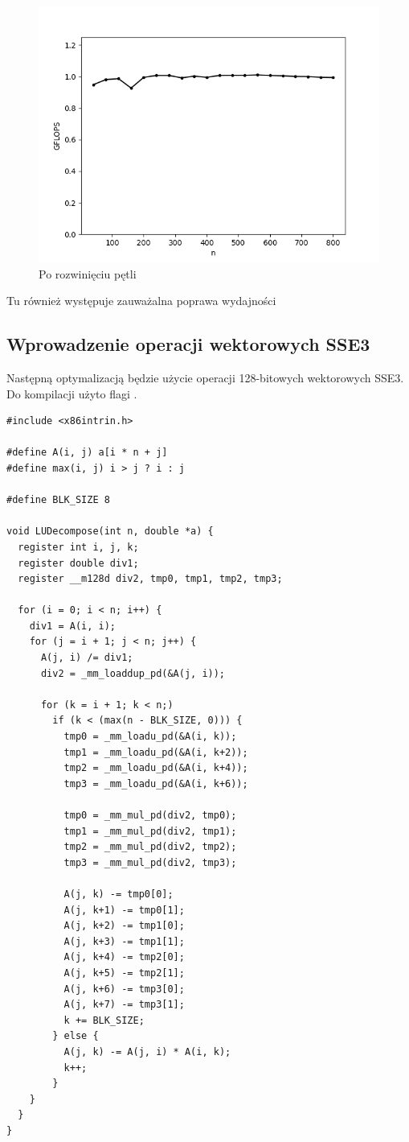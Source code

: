 \documentclass{article}
\begin{document}
\begin{figure}[H]
    \centering
    \includegraphics[width=1.0\textwidth]{figures/fig2.png}
    \caption{Po rozwinięciu pętli}
\end{figure}

Tu również występuje zauważalna poprawa wydajności

\subsection{Wprowadzenie operacji wektorowych SSE3}

Następną optymalizacją będzie użycie operacji 128-bitowych wektorowych SSE3.
Do kompilacji użyto flagi .

\begin{verbatim}
#include <x86intrin.h>

#define A(i, j) a[i * n + j]
#define max(i, j) i > j ? i : j

#define BLK_SIZE 8

void LUDecompose(int n, double *a) {
  register int i, j, k; 
  register double div1;
  register __m128d div2, tmp0, tmp1, tmp2, tmp3;

  for (i = 0; i < n; i++) {
    div1 = A(i, i);
    for (j = i + 1; j < n; j++) {
      A(j, i) /= div1;
      div2 = _mm_loaddup_pd(&A(j, i));

      for (k = i + 1; k < n;)
        if (k < (max(n - BLK_SIZE, 0))) {
          tmp0 = _mm_loadu_pd(&A(i, k));
          tmp1 = _mm_loadu_pd(&A(i, k+2));
          tmp2 = _mm_loadu_pd(&A(i, k+4));
          tmp3 = _mm_loadu_pd(&A(i, k+6));

          tmp0 = _mm_mul_pd(div2, tmp0);
          tmp1 = _mm_mul_pd(div2, tmp1);
          tmp2 = _mm_mul_pd(div2, tmp2);
          tmp3 = _mm_mul_pd(div2, tmp3);

          A(j, k) -= tmp0[0];
          A(j, k+1) -= tmp0[1];
          A(j, k+2) -= tmp1[0];
          A(j, k+3) -= tmp1[1];
          A(j, k+4) -= tmp2[0];
          A(j, k+5) -= tmp2[1];
          A(j, k+6) -= tmp3[0];
          A(j, k+7) -= tmp3[1];
          k += BLK_SIZE;
        } else {
          A(j, k) -= A(j, i) * A(i, k);
          k++;
        }
    }
  }
}
\end{verbatim}
\end{document}
